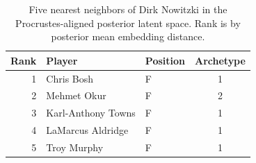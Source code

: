 \begin{table}[htbp]
  \centering\small
  \begin{tabular}{rllc}
    \toprule
    Rank & Player & Position & Archetype \\
    \midrule
    1 & Chris Bosh & F & 1 \\
    2 & Mehmet Okur & F & 2 \\
    3 & Karl-Anthony Towns & F & 1 \\
    4 & LaMarcus Aldridge & F & 1 \\
    5 & Troy Murphy & F & 1 \\
    \bottomrule
  \end{tabular}
  \caption{Five nearest neighbors of Dirk Nowitzki in the Procrustes-aligned posterior latent space. Rank is by posterior mean embedding distance.}
  \label{tab:Dirk_Nowitzki_neighbors}
\end{table}

